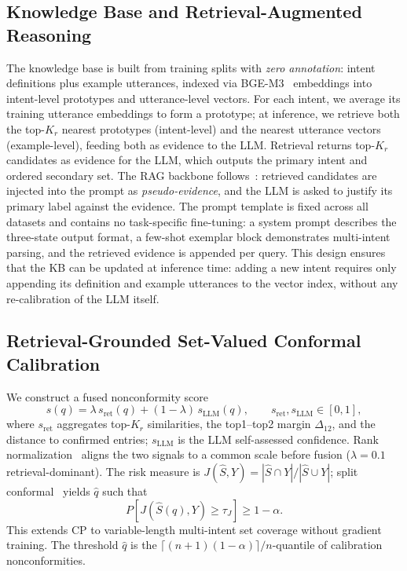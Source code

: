 \documentclass[sigconf, anonymous, review]{acmart}
\begin{document}
\subsection{Knowledge Base and Retrieval-Augmented Reasoning}
The knowledge base is built from training splits with \emph{zero annotation}: intent definitions plus example utterances, indexed via BGE-M3~\citep{bge} embeddings into intent-level prototypes and utterance-level vectors. For each intent, we average its training utterance embeddings to form a prototype; at inference, we retrieve both the top-$K_r$ nearest prototypes (intent-level) and the nearest utterance vectors (example-level), feeding both as evidence to the LLM. Retrieval returns top-$K_r$ candidates as evidence for the LLM, which outputs the primary intent and ordered secondary set. The RAG backbone follows~\citet{lewis2020rag,gao2024retrieval}: retrieved candidates are injected into the prompt as \textit{pseudo-evidence}, and the LLM is asked to justify its primary label against the evidence. The prompt template is fixed across all datasets and contains no task-specific fine-tuning: a system prompt describes the three-state output format, a few-shot exemplar block demonstrates multi-intent parsing, and the retrieved evidence is appended per query. This design ensures that the KB can be updated at inference time: adding a new intent requires only appending its definition and example utterances to the vector index, without any re-calibration of the LLM itself.

\subsection{Retrieval-Grounded Set-Valued Conformal Calibration}
We construct a fused nonconformity score
\begin{equation}
s(q)=\lambda\,s_{\text{ret}}(q)+(1-\lambda)\,s_{\text{LLM}}(q),\qquad s_{\text{ret}},s_{\text{LLM}}\in[0,1],
\end{equation}
where $s_{\text{ret}}$ aggregates top-$K_r$ similarities, the top1--top2 margin $\Delta_{12}$, and the distance to confirmed entries; $s_{\text{LLM}}$ is the LLM self-assessed confidence. Rank normalization~\citep{angelopoulos2021gentle} aligns the two signals to a common scale before fusion ($\lambda=0.1$ retrieval-dominant). The risk measure is $J(\hat{S},Y)=|\hat{S}\cap Y|/|\hat{S}\cup Y|$; split conformal~\citep{vovk2005algorithmic,romano2020conformal} yields $\hat{q}$ such that
\begin{equation}
P\!\left[J\!\left(\hat{S}(q),Y\right)\ge\tau_J\right]\ge 1-\alpha.
\end{equation}
This extends CP to variable-length multi-intent set coverage without gradient training. The threshold $\hat{q}$ is the $\lceil (n+1)(1-\alpha)\rceil/n$-quantile of calibration nonconformities.
\end{document}
